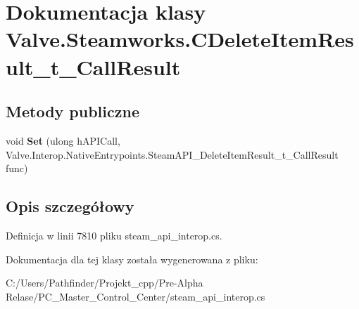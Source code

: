 \hypertarget{class_valve_1_1_steamworks_1_1_c_delete_item_result__t___call_result}{}\section{Dokumentacja klasy Valve.\+Steamworks.\+C\+Delete\+Item\+Result\+\_\+t\+\_\+\+Call\+Result}
\label{class_valve_1_1_steamworks_1_1_c_delete_item_result__t___call_result}
\subsection*{Metody publiczne}
\begin{DoxyCompactItemize}
\item 
\mbox{\label{class_valve_1_1_steamworks_1_1_c_delete_item_result__t___call_result_accd1a5e2ebaa6575045a6bcfac099fd3}} 
void {\bfseries Set} (ulong h\+A\+P\+I\+Call, Valve.\+Interop.\+Native\+Entrypoints.\+Steam\+A\+P\+I\+\_\+\+Delete\+Item\+Result\+\_\+t\+\_\+\+Call\+Result func)
\end{DoxyCompactItemize}


\subsection{Opis szczegółowy}


Definicja w linii 7810 pliku steam\+\_\+api\+\_\+interop.\+cs.



Dokumentacja dla tej klasy została wygenerowana z pliku\+:\begin{DoxyCompactItemize}
\item 
C\+:/\+Users/\+Pathfinder/\+Projekt\+\_\+cpp/\+Pre-\/\+Alpha Relase/\+P\+C\+\_\+\+Master\+\_\+\+Control\+\_\+\+Center/steam\+\_\+api\+\_\+interop.\+cs\end{DoxyCompactItemize}
